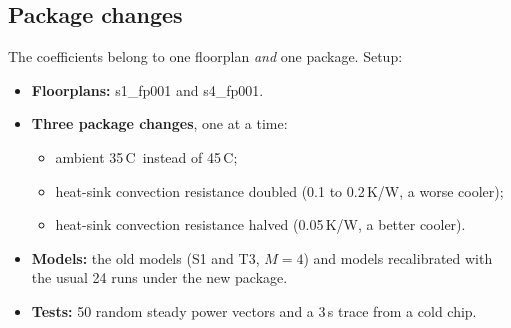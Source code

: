 \documentclass[11pt,a4paper]{article}
\newcommand{\degC}{\,\textdegree C}
\begin{document}
\subsection{Package changes}
The coefficients belong to one floorplan \emph{and} one package. Setup:
\begin{itemize}
  \item \textbf{Floorplans:} s1\_fp001 and s4\_fp001.
  \item \textbf{Three package changes}, one at a time:
  \begin{itemize}
    \item ambient 35\degC\ instead of 45\degC;
    \item heat-sink convection resistance doubled (0.1 to 0.2\,K/W, a worse cooler);
    \item heat-sink convection resistance halved (0.05\,K/W, a better cooler).
  \end{itemize}
  \item \textbf{Models:} the old models (S1 and T3, $M=4$) and models recalibrated with the usual
        24 runs under the new package.
  \item \textbf{Tests:} 50 random steady power vectors and a 3\,s trace from a cold chip.
\end{itemize}
\end{document}

